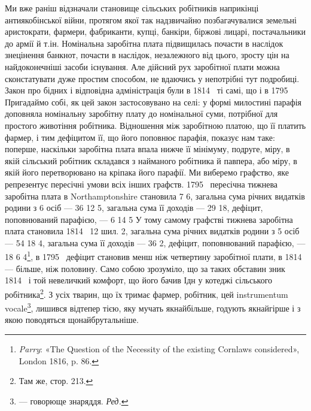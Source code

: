 Ми вже раніш відзначали становище сільських робітників
наприкінці антиякобінської війни, протягом якої так надзвичайно
позбагачувалися земельні аристократи, фармери, фабриканти,
купці, банкіри, біржові лицарі, постачальники до армії
й т.ін. Номінальна заробітна плата підвищилась почасти в наслідок
знецінення банкнот, почасти в наслідок, незалежного від
цього, зросту цін на найдоконечніші засоби існування. Але дійсний
рух заробітної плати можна сконстатувати дуже простим
способом, не вдаючись у непотрібні тут подробиці. Закон про
бідних і відповідна адміністрація були в 1814~ ті самі, що і в
1795~ Пригадаймо собі, як цей закон застосовувано на селі:
у формі милостині парафія доповняла номінальну заробітну
плату до номінальної суми, потрібної для простого животіння
робітника. Відношення між заробітною платою, що її платить
фармер, і тим дефіцитом її, що його поповнює парафія, показує
нам таке: поперше, наскільки заробітна плата впала нижче її
мінімуму, подруге, міру, в якій сільський робітник складався
з найманого робітника й павпера, або міру, в якій його перетворювано
на кріпака його парафії. Ми виберемо графство, яке
репрезентує пересічні умови всіх інших графств. 1795~ пересічна
тижнева заробітна плата в Northamptonshire становила
7 6, загальна сума річних видатків родини з
6 осіб — 36 12 5, загальна сума
її доходів — 29 18, дефіцит, поповнюваний
парафією, — 6 14 5
У тому самому графстві тижнева заробітна плата становила 1814~
12 шил. 2, загальна сума річних видатків родини з 5 осіб —
54 18 4, загальна сума її доходів
— 36 2, дефіцит, поповнюваний
парафією, — 18 6 4\footnote{
\emph{Parry}: «The Question of the Necessity of the existing Cornlaws
considered», London 1816, p. 86.
}, в 1795~
дефіцит становив менш ніж четвертину заробітної плати, в
1814~ — більше, ніж половину. Само собою зрозуміло, що за
таких обставин зник 1814~ і той невеличкий комфорт, що його
бачив Ідн у котеджі сільського робітника\footnote{
Там же, стор. 213.
}. З усіх тварин,
що їх тримає фармер, робітник, цей instrumentum vocale\footnote*{
— говорюще знаряддя. \emph{Ред.}
}, лишився
відтепер тією, яку мучать якнайбільше, годують якнайгірше і
з  якою поводяться щонайбрутальніше.

